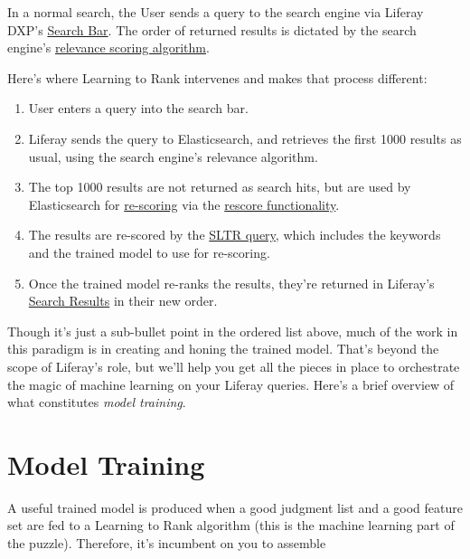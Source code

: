 In a normal search, the User sends a query to the search engine via
Liferay DXP's
\href{/docs/7-2/user/-/knowledge_base/u/searching-for-assets\#search-bar}{Search
Bar}. The order of returned results is dictated by the search engine's
\href{https://www.elastic.co/guide/en/elasticsearch/reference/7.x/index-modules-similarity.html\#bm25}{relevance
scoring algorithm}.

Here's where Learning to Rank intervenes and makes that process
different:

\begin{enumerate}
\def\labelenumi{\arabic{enumi}.}
\item
  User enters a query into the search bar.
\item
  Liferay sends the query to Elasticsearch, and retrieves the first 1000
  results as usual, using the search engine's relevance algorithm.
\item
  The top 1000 results are not returned as search hits, but are used by
  Elasticsearch for
  \href{https://www.elastic.co/guide/en/elasticsearch/reference/7.x/search-request-body.html\#request-body-search-rescore}{re-scoring}
  via the
  \href{https://elasticsearch-learning-to-rank.readthedocs.io/en/latest/searching-with-your-model.html\#rescore-top-n-with-sltr}{rescore
  functionality}.
\item
  The results are re-scored by the
  \href{https://elasticsearch-learning-to-rank.readthedocs.io/en/latest/searching-with-your-model.html}{SLTR
  query}, which includes the keywords and the trained model to use for
  re-scoring.
\item
  Once the trained model re-ranks the results, they're returned in
  Liferay's
  \href{/docs/7-2/user/-/knowledge_base/u/search-results}{Search
  Results} in their new order.
\end{enumerate}

Though it's just a sub-bullet point in the ordered list above, much of
the work in this paradigm is in creating and honing the trained model.
That's beyond the scope of Liferay's role, but we'll help you get all
the pieces in place to orchestrate the magic of machine learning on your
Liferay queries. Here's a brief overview of what constitutes \emph{model
training}.

\section{Model Training}\label{model-training}

A useful trained model is produced when a good judgment list and a good
feature set are fed to a Learning to Rank algorithm (this is the machine
learning part of the puzzle). Therefore, it's incumbent on you to
assemble

